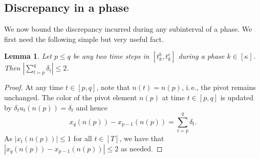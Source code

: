 \documentclass[11pt]{article}
\numberwithin{equation}{section}
\newtheorem{lemma}[theorem]{Lemma}
\theoremstyle{definition}
\theoremstyle{plain}
\newcommand{\ie}{i.\,e.}
\begin{document}
\subsection{Discrepancy in a phase}
We now bound the discrepancy incurred during any subinterval of a phase. We first need the following simple but very useful fact.
\begin{lemma}
\label{lem:sumofdelta}
Let $p \le q$ be any two time steps in $[t^b_k, t^e_k]$ during a phase $k \in [\kappa]$.
Then $ \left|\sum_{t=p}^{q} \delta_{t}\right| \le 2$.
\end{lemma}
\begin{proof}
At any time $t \in [p,q]$, note that $n(t) = n(p)$, \ie, the pivot remains
unchanged. The color of the pivot element $n(p)$ at time $t \in [p,q]$ is
updated by $\delta_t u_t(n(p)) = \delta_t$ and hence
\[
  x_{q}(n(p)) - x_{p-1}(n(p)) = \sum_{t=p}^{q} \delta_{t}.
\]
As $|x_t(n(p))| \le 1$ for all $t \in [T]$, we have that $|x_{q}(n(p)) -
x_{p-1}(n(p))| \le 2$ as needed.
\end{proof}
\end{document}
